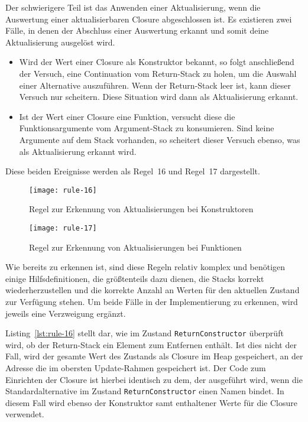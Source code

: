 Der schwierigere Teil ist das Anwenden einer Aktualisierung, wenn die Auswertung einer aktualisierbaren Closure abgeschlossen ist.
Es existieren zwei Fälle, in denen der Abschluss einer Auswertung erkannt und somit deine Aktualisierung ausgelöst wird.

\begin{itemize}
\item
  Wird der Wert einer Closure als Konstruktor bekannt, so folgt anschließend der Versuch, eine Continuation vom Return-Stack zu holen, um die Auswahl einer Alternative auszuführen.
  Wenn der Return-Stack leer ist, kann dieser Versuch nur scheitern.
  Diese Situation wird dann als Aktualisierung erkannt.
\item
  Ist der Wert einer Closure eine Funktion, versucht diese die Funktionsargumente vom Argument-Stack zu konsumieren.
  Sind keine Argumente auf dem Stack vorhanden, so scheitert dieser Versuch ebenso, was als Aktualisierung erkannt wird.
\end{itemize}

Diese beiden Ereignisse werden als Regel~16 und Regel~17 dargestellt.

\begin{figure}[h]
  \centering
  \texttt{[image: rule-16]}
  \caption{Regel zur Erkennung von Aktualisierungen bei Konstruktoren}\label{fig:rule-16}
\end{figure}

\begin{figure}[h]
  \centering
  \texttt{[image: rule-17]}
  \caption{Regel zur Erkennung von Aktualisierungen bei Funktionen}\label{fig:rule-17}
\end{figure}

Wie bereits zu erkennen ist, sind diese Regeln relativ komplex und benötigen einige Hilfsdefinitionen, die größtenteils dazu dienen, die Stacks korrekt wiederherzustellen und die korrekte Anzahl an Werten für den aktuellen Zustand zur Verfügung stehen.
Um beide Fälle in der Implementierung zu erkennen, wird jeweils eine Verzweigung ergänzt.

Listing~\ref{lst:rule-16} stellt dar, wie im Zustand \texttt{ReturnConstructor} überprüft wird, ob der Return-Stack ein Element zum Entfernen enthält.
Ist dies nicht der Fall, wird der gesamte Wert des Zustands als Closure im Heap gespeichert, an der Adresse die im obersten Update-Rahmen gespeichert ist.
Der Code zum Einrichten der Closure ist hierbei identisch zu dem, der ausgeführt wird, wenn die Standardalternative im Zustand \texttt{ReturnConstructor} einen Namen bindet.
In diesem Fall wird ebenso der Konstruktor samt enthaltener Werte für die Closure verwendet.

